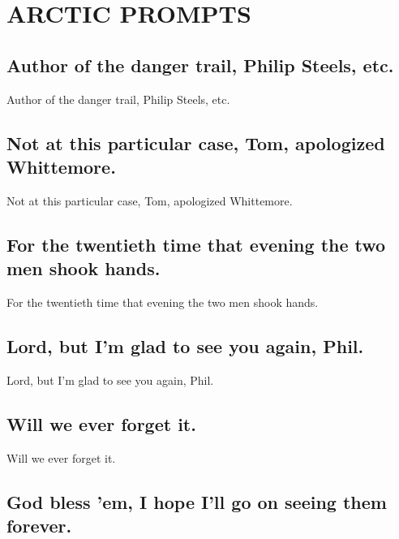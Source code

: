 \documentclass[]{article}
\date{}
\begin{document}
\hypertarget{arctic-prompts}{%
\section{ARCTIC PROMPTS}\label{arctic-prompts}}

\hypertarget{author-of-the-danger-trail-philip-steels-etc.}{%
\subsection{Author of the danger trail, Philip Steels,
etc.}\label{author-of-the-danger-trail-philip-steels-etc.}}

Author of the danger trail, Philip Steels, etc.

\hypertarget{not-at-this-particular-case-tom-apologized-whittemore.}{%
\subsection{Not at this particular case, Tom, apologized
Whittemore.}\label{not-at-this-particular-case-tom-apologized-whittemore.}}

Not at this particular case, Tom, apologized Whittemore.

\hypertarget{for-the-twentieth-time-that-evening-the-two-men-shook-hands.}{%
\subsection{For the twentieth time that evening the two men shook
hands.}\label{for-the-twentieth-time-that-evening-the-two-men-shook-hands.}}

For the twentieth time that evening the two men shook hands.

\hypertarget{lord-but-im-glad-to-see-you-again-phil.}{%
\subsection{Lord, but I'm glad to see you again,
Phil.}\label{lord-but-im-glad-to-see-you-again-phil.}}

Lord, but I'm glad to see you again, Phil.

\hypertarget{will-we-ever-forget-it.}{%
\subsection{Will we ever forget it.}\label{will-we-ever-forget-it.}}

Will we ever forget it.

\hypertarget{god-bless-em-i-hope-ill-go-on-seeing-them-forever.}{%
\subsection{God bless 'em, I hope I'll go on seeing them
forever.}\label{god-bless-em-i-hope-ill-go-on-seeing-them-forever.}}
\end{document}
